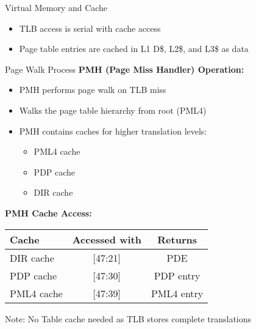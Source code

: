 \documentclass[aspectratio=169,12pt]{beamer}
\begin{document}
\begin{frame}{Virtual Memory and Cache}
\begin{itemize}
    \item TLB access is serial with cache access
    \item Page table entries are cached in L1 D\$, L2\$, and L3\$ as data
\end{itemize}
\end{frame}

\begin{frame}{Page Walk Process}
\textbf{PMH (Page Miss Handler) Operation:}
\begin{itemize}
    \item PMH performs page walk on TLB miss
    \item Walks the page table hierarchy from root (PML4)
    \item PMH contains caches for higher translation levels:
    \begin{itemize}
        \item PML4 cache
        \item PDP cache
        \item DIR cache
    \end{itemize}
\end{itemize}

\vspace{1em}
\textbf{PMH Cache Access:}
\begin{center}
\begin{tabular}{|l|c|c|}
\hline
\textbf{Cache} & \textbf{Accessed with} & \textbf{Returns} \\
\hline
DIR cache & [47:21] & PDE \\
PDP cache & [47:30] & PDP entry \\
PML4 cache & [47:39] & PML4 entry \\
\hline
\end{tabular}
\end{center}

\vspace{0.5em}
Note: No Table cache needed as TLB stores complete translations
\end{frame}
\end{document}
